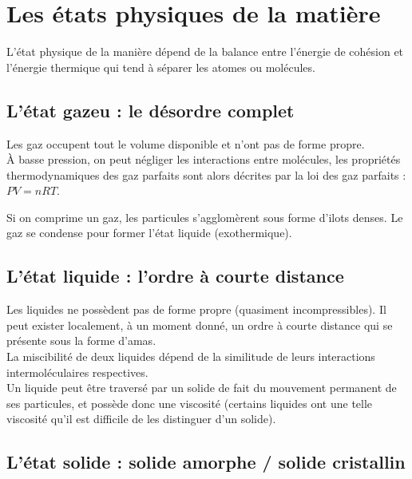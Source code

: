 \documentclass[13pt, twoside, a4paper, french, tikz]{report}
\begin{document}
    \chapter{Les états physiques de la matière}\label{ch:les-etats-physiques-de-la-matiere}

    L'état physique de la manière dépend de la balance entre l'énergie de cohésion et l'énergie thermique qui tend à séparer les atomes ou molécules.


    \section{L'état gazeu : le désordre complet}\label{sec:l'etat-gazeu-:-le-desordre-complet}

    Les gaz occupent tout le volume disponible et n'ont pas de forme propre.\\

    À basse pression, on peut négliger les interactions entre molécules, les propriétés thermodynamiques des gaz parfaits sont alors décrites par la loi des gaz parfaits : $PV = nRT$.

    Si on comprime un gaz, les particules s'agglomèrent sous forme d'ilots denses.
    Le gaz se condense pour former l'état liquide (exothermique).


    \section{L'état liquide : l'ordre à courte distance}\label{sec:l'etat-liquide-:-l'ordre-a-courte-distance}

    Les liquides ne possèdent pas de forme propre (quasiment incompressibles).
    Il peut exister localement, à un moment donné, un ordre à courte distance qui se présente sous la forme d'amas.\\

    La miscibilité de deux liquides dépend de la similitude de leurs interactions intermoléculaires respectives.\\
    Un liquide peut être traversé par un solide de fait du mouvement permanent de ses particules, et possède donc une viscosité (certains liquides ont une telle viscosité qu'il est difficile de les distinguer d'un solide).


    \section{L'état solide : solide amorphe / solide cristallin}\label{sec:l'etat-solide-:-solide-amorphe-/-solide-cristallin}
\end{document}

